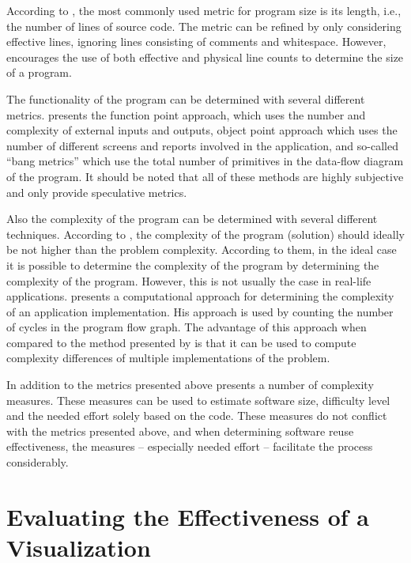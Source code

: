 According to \citet{fenton_software_1998}, the most commonly used metric for program size is its length, i.e., the number of lines of source code. The metric can be refined by only considering effective lines, ignoring lines consisting of comments and whitespace. However, \citet{fenton_software_1998} encourages the use of both effective and physical line counts to determine the size of a program.

The functionality of the program can be determined with several different metrics. \citet{fenton_software_1998} presents the function point approach, which uses the number and complexity of external inputs and outputs, object point approach which uses the number of different screens and reports involved in the application, and so-called ``bang metrics'' which use the total number of primitives in the data-flow diagram of the program. It should be noted that all of these methods are highly subjective and only provide speculative metrics.

Also the complexity of the program can be determined with several different techniques. According to \citet{fenton_software_1998}, the complexity of the program (solution) should ideally be not higher than the problem complexity. According to them, in the ideal case it is possible to determine the complexity of the program by determining the complexity of the program. However, this is not usually the case in real-life applications. \citet{mccabe_complexity_1976} presents a computational approach for determining the complexity of an application implementation. His approach is used by counting the number of cycles in the program flow graph. The advantage of this approach when compared to the method presented by \citet{fenton_software_1998} is that it can be used to compute complexity differences of multiple implementations of the problem.

In addition to the metrics presented above \citet{halstead_elements_1977} presents a number of complexity measures. These measures can be used to estimate software size, difficulty level and the needed effort solely based on the code. These measures do not conflict with the metrics presented above, and when determining software reuse effectiveness, the measures -- especially needed effort -- facilitate the process considerably.


\section{Evaluating the Effectiveness of a Visualization}

